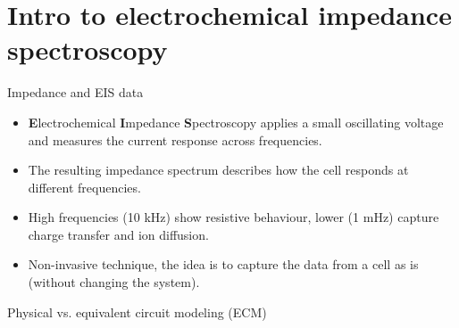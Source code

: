 \documentclass[aspectratio=169,12pt]{beamer}
\begin{document}
\section{Intro to electrochemical impedance spectroscopy}
\begin{frame}{Impedance and EIS data}
  \begin{itemize}
    \setlength{\itemsep}{0.95em}
    \item \textbf{E}lectrochemical \textbf{I}mpedance \textbf{S}pectroscopy
    applies a small oscillating voltage and measures the current response across frequencies.
    \item The resulting impedance spectrum describes how the cell responds at different frequencies.
    \item High frequencies (10 kHz) show resistive behaviour, lower (1 mHz) capture charge transfer and ion diffusion.
    \item Non-invasive technique, the idea is to capture the data from a cell as is (without changing the system).
  \end{itemize}
\end{frame}

\begin{frame}{Physical vs. equivalent circuit modeling (ECM)}
  \vspace{0.5cm}
\end{frame}
\end{document}

